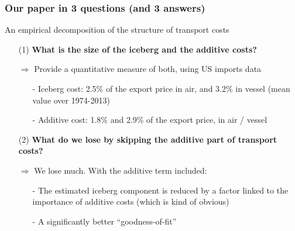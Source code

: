 \documentclass[10 pt,Helvetica, french]{beamer}
\begin{document}
\begin{frame}
\frametitle{Our paper in 3 questions (and 3 answers)}
An empirical decomposition of the structure of transport costs \vspace{0.2cm}
\begin{itemize}
\item[(1)]\textbf{ What is the size of the iceberg and the additive costs?} \vspace{0.1cm}
\item[$\Rightarrow$] Provide a quantitative measure of both, using US imports data \vspace{0.1cm}
\begin{itemize}
\item[-] Iceberg cost: 2.5\% of the export price in air, and 3.2\% in vessel (mean value over 1974-2013) \vspace{0.1cm}
\item[-] Additive cost: 1.8\% and 2.9\% of the export price, in air / vessel  \vspace{0.2cm}
\end{itemize}
\item[(2)] \textbf{ What do we lose by skipping the additive part of transport costs?} \vspace{0.1cm}
\item[$\Rightarrow$] We lose much. With the additive term included:\vspace{0.1cm}
\begin{itemize}
\item[-] The estimated iceberg component is reduced by a factor linked to the importance of additive costs (which is kind of obvious) \vspace{0.1cm}
\item[-] A significantly better ``goodness-of-fit'' \vspace{0.1cm}
\end{itemize}
\end{itemize}
\end{frame}
\end{document}
